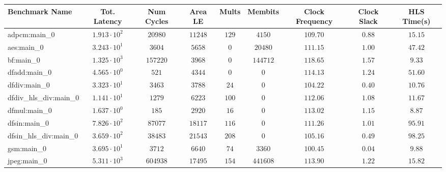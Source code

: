 \begin{tabular}{|l|c|c|c|c|c|c|c|c|}
\hline
Benchmark Name          & Tot. Latency           & Num Cycles  & Area LE    & Mults   & Membits    & Clock Frequency & Clock Slack & HLS Time(s) \\
\hline
adpcm:main\_0           & $ 1.913 \cdot 10^{2} $ & $ 20980   $ & $ 11248  $ & $ 129 $ & $ 4150   $ & $ 109.70      $ & $ 0.88    $ & $ 15.15   $ \\
aes:main\_0             & $ 3.243 \cdot 10^{1} $ & $ 3604    $ & $ 5658   $ & $ 0   $ & $ 20480  $ & $ 111.15      $ & $ 1.00    $ & $ 47.42   $ \\
bf:main\_0              & $ 1.325 \cdot 10^{3} $ & $ 157220  $ & $ 3968   $ & $ 0   $ & $ 144712 $ & $ 118.65      $ & $ 1.57    $ & $ 9.33    $ \\
dfadd:main\_0           & $ 4.565 \cdot 10^{0} $ & $ 521     $ & $ 4344   $ & $ 0   $ & $ 0      $ & $ 114.13      $ & $ 1.24    $ & $ 51.60   $ \\
dfdiv:main\_0           & $ 3.323 \cdot 10^{1} $ & $ 3463    $ & $ 3788   $ & $ 24  $ & $ 0      $ & $ 104.22      $ & $ 0.40    $ & $ 10.76   $ \\
dfdiv\_hls\_div:main\_0 & $ 1.141 \cdot 10^{1} $ & $ 1279    $ & $ 6223   $ & $ 100 $ & $ 0      $ & $ 112.06      $ & $ 1.08    $ & $ 11.67   $ \\
dfmul:main\_0           & $ 1.637 \cdot 10^{0} $ & $ 185     $ & $ 2920   $ & $ 16  $ & $ 0      $ & $ 113.02      $ & $ 1.15    $ & $ 8.87    $ \\
dfsin:main\_0           & $ 7.826 \cdot 10^{2} $ & $ 87077   $ & $ 18117  $ & $ 116 $ & $ 0      $ & $ 111.26      $ & $ 1.01    $ & $ 95.91   $ \\
dfsin\_hls\_div:main\_0 & $ 3.659 \cdot 10^{2} $ & $ 38483   $ & $ 21543  $ & $ 208 $ & $ 0      $ & $ 105.16      $ & $ 0.49    $ & $ 98.25   $ \\
gsm:main\_0             & $ 3.695 \cdot 10^{1} $ & $ 3712    $ & $ 6640   $ & $ 74  $ & $ 3360   $ & $ 100.45      $ & $ 0.04    $ & $ 9.88    $ \\
jpeg:main\_0            & $ 5.311 \cdot 10^{3} $ & $ 604938  $ & $ 17495  $ & $ 154 $ & $ 441608 $ & $ 113.90      $ & $ 1.22    $ & $ 15.82   $ \\

\end{tabular}
